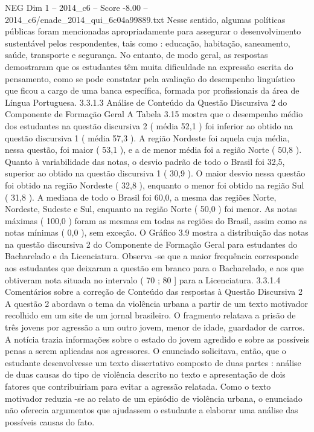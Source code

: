 \begin{textsample}{NEG Dim 1 – 2014\_c6 – Score -8.00 – 2014\_c6/enade\_2014\_qui\_6c04a99889.txt}
Nesse sentido, algumas políticas públicas foram mencionadas apropriadamente para assegurar o desenvolvimento sustentável pelos respondentes, tais como : educação, habitação, saneamento, saúde, transporte e segurança.
No entanto, de modo geral, as respostas demostraram que os estudantes têm muita dificuldade na expressão escrita do pensamento, como se pode constatar pela avaliação do desempenho linguístico que ficou a cargo de uma banca específica, formada por profissionais da área de Língua Portuguesa. 3.3.1.3 Análise de Conteúdo da Questão Discursiva 2 do Componente de Formação Geral A Tabela 3.15 mostra que o desempenho médio dos estudantes na questão discursiva 2 ( média 52,1 ) foi inferior ao obtido na questão discursiva 1 ( média 57,3 ).
A região Nordeste foi aquela cuja média, nessa questão, foi maior ( 53,1 ), e a de menor média foi a região Norte ( 50,8 ).
Quanto à variabilidade das notas, o desvio padrão de todo o Brasil foi 32,5, superior ao obtido na questão discursiva 1 ( 30,9 ).
O maior desvio nessa questão foi obtido na região Nordeste ( 32,8 ), enquanto o menor foi obtido na região Sul ( 31,8 ).
A mediana de todo o Brasil foi 60,0, a mesma das regiões Norte, Nordeste, Sudeste e Sul, enquanto na região Norte ( 50,0 ) foi menor.
As notas máximas ( 100,0 ) foram as mesmas em todas as regiões do Brasil, assim como as notas mínimas ( 0,0 ), sem exceção.
O Gráfico 3.9 mostra a distribuição das notas na questão discursiva 2 do Componente de Formação Geral para estudantes do Bacharelado e da Licenciatura.
Observa -se que a maior frequência corresponde aos estudantes que deixaram a questão em branco para o Bacharelado, e aos que obtiveram nota situada no intervalo ( 70 ; 80 ] para a Licenciatura. 3.3.1.4 Comentários sobre a correção de Conteúdo das respostas à Questão Discursiva 2 A questão 2 abordava o tema da violência urbana a partir de um texto motivador recolhido em um site de um jornal brasileiro.
O fragmento relatava a prisão de três jovens por agressão a um outro jovem, menor de idade, guardador de carros.
A notícia trazia informações sobre o estado do jovem agredido e sobre as possíveis penas a serem aplicadas aos agressores.
O enunciado solicitava, então, que o estudante desenvolvesse um texto dissertativo composto de duas partes : análise de duas causas do tipo de violência descrito no texto e apresentação de dois fatores que contribuiriam para evitar a agressão relatada.
Como o texto motivador reduzia -se ao relato de um episódio de violência urbana, o enunciado não oferecia argumentos que ajudassem o estudante a elaborar uma análise das possíveis causas do fato.

\end{textsample}

